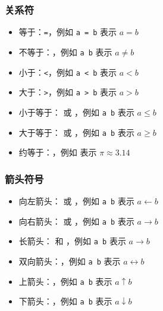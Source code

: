 \documentclass{article}
\begin{document}
\subsubsection{关系符}
\begin{itemize}
    \item 等于：\texttt{=}，例如 \texttt{a = b} 表示 \(a = b\)
    \item 不等于：\texttt{\ne}，例如 \texttt{a \ne b} 表示 \(a \ne b\)
    \item 小于：\texttt{<}，例如 \texttt{a < b} 表示 \(a < b\)
    \item 大于：\texttt{>}，例如 \texttt{a > b} 表示 \(a > b\)
    \item 小于等于：\texttt{\le} 或 \texttt{\leq}，例如 \texttt{a \le b} 表示 \(a \le b\)
    \item 大于等于：\texttt{\ge} 或 \texttt{\geq}，例如 \texttt{a \ge b} 表示 \(a \ge b\)
    \item 约等于：\texttt{\approx}，例如 \texttt{\pi {}} 表示 \(\pi \approx 3.14\)
\end{itemize}

\subsubsection{箭头符号}
\begin{itemize}
    \item 向左箭头：\texttt{\leftarrow} 或 \texttt{\gets}，例如 \texttt{a \leftarrow b} 表示 \(a \leftarrow b\)
    \item 向右箭头：\texttt{\rightarrow} 或 \texttt{\to}，例如 \texttt{a \rightarrow b} 表示 \(a \rightarrow b\)
    \item 长箭头：\texttt{\longrightarrow} 和 \texttt{\longleftarrow}，例如 \texttt{a \longrightarrow b} 表示 \(a \longrightarrow b\)
    \item 双向箭头：\texttt{\leftrightarrow}，例如 \texttt{a \leftrightarrow b} 表示 \(a \leftrightarrow b\)
    \item 上箭头：\texttt{\uparrow}，例如 \texttt{a \uparrow b} 表示 \(a \uparrow b\)
    \item 下箭头：\texttt{\downarrow}，例如 \texttt{a \downarrow b} 表示 \(a \downarrow b\)
\end{itemize}
\end{document}
